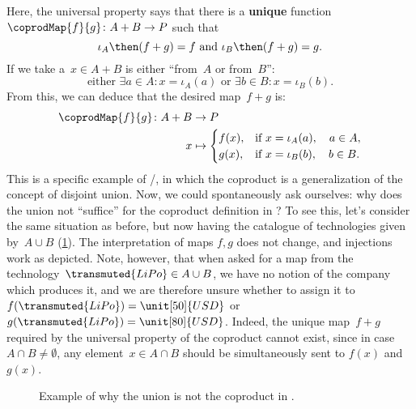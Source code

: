 \begin{example}
Here, the universal property says that there is a \textbf{unique} function~$\coprodMap{f}{g}\colon A+B\to P$ such that 
\begin{equation*}
    \iota_A\then (f+ g)=f \text{ and }\iota_B\then (f+ g)=g.
\end{equation*}
If we take a~$x\in A+B$ is either ``from~$A$ or from~$B$'':
\begin{equation*}
    \text{either } \exists a\in A:x=\iota_A(a) \text{ or }\exists b\in B:x=\iota_B(b).
\end{equation*}
From this, we can deduce that the desired map~$f+g$ is:
\begin{equation*}
\begin{aligned}
    \coprodMap{f}{g} \colon  A + B &\to P \\
    x &   \mapsto
    \begin{cases}
        f(x),& \text{if } x=\iota_A(a),\quad a \in A, \\
        g(x),& \text{if } x=\iota_B(b),\quad b \in B.
    \end{cases}
\end{aligned}
\end{equation*}
This is a specific example of \Set/\FinSet, in which the coproduct is a generalization of the concept of disjoint union. Now, we could spontaneously ask ourselves: why does the union not ``suffice'' for the coproduct definition in \Set? To see this, let's consider the same situation as before, but now having the catalogue of technologies given by~$A\cup B$ (\cref{fig:coprod_batteries_2}). The interpretation of maps $f,g$ does not change, and injections work as depicted. Note, however, that when asked for a map from the technology~$\transmuted{LiPo}\in A\cup B$, we have no notion of the company which produces it, and we are therefore unsure whether to assign it to~$f(\transmuted{LiPo})=\unit[50]{USD}$ or~$g(\transmuted{LiPo})=\unit[80]{USD}$. Indeed, the unique map~$f+g$ required by the universal property of the coproduct cannot exist, since in case $A\cap B\neq \emptyset$, any element~$x\in A\cap B$ should be simultaneously sent to $f(x)$ and $g(x)$.

\begin{figure}[h!]
    \centering
    \caption{Example of why the union is not the coproduct in \Set.}
    \label{fig:coprod_batteries_2}
\end{figure}
\end{example}


